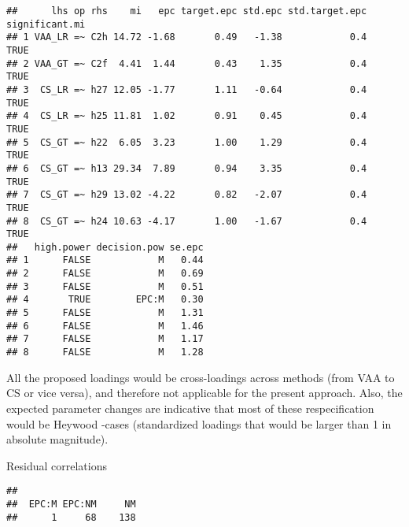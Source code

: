 \documentclass[
]{article}
\newenvironment{Shaded}{\begin{snugshade}}{\end{snugshade}}
\newcommand{\CommentTok}[1]{\textcolor[rgb]{0.56,0.35,0.01}{\textit{#1}}}
\newcommand{\DataTypeTok}[1]{\textcolor[rgb]{0.13,0.29,0.53}{#1}}
\newcommand{\DecValTok}[1]{\textcolor[rgb]{0.00,0.00,0.81}{#1}}
\newcommand{\KeywordTok}[1]{\textcolor[rgb]{0.13,0.29,0.53}{\textbf{#1}}}
\newcommand{\NormalTok}[1]{#1}
\newcommand{\OperatorTok}[1]{\textcolor[rgb]{0.81,0.36,0.00}{\textbf{#1}}}
\newcommand{\StringTok}[1]{\textcolor[rgb]{0.31,0.60,0.02}{#1}}
\begin{document}
\begin{verbatim}
##      lhs op rhs    mi   epc target.epc std.epc std.target.epc significant.mi
## 1 VAA_LR =~ C2h 14.72 -1.68       0.49   -1.38            0.4           TRUE
## 2 VAA_GT =~ C2f  4.41  1.44       0.43    1.35            0.4           TRUE
## 3  CS_LR =~ h27 12.05 -1.77       1.11   -0.64            0.4           TRUE
## 4  CS_LR =~ h25 11.81  1.02       0.91    0.45            0.4           TRUE
## 5  CS_GT =~ h22  6.05  3.23       1.00    1.29            0.4           TRUE
## 6  CS_GT =~ h13 29.34  7.89       0.94    3.35            0.4           TRUE
## 7  CS_GT =~ h29 13.02 -4.22       0.82   -2.07            0.4           TRUE
## 8  CS_GT =~ h24 10.63 -4.17       1.00   -1.67            0.4           TRUE
##   high.power decision.pow se.epc
## 1      FALSE            M   0.44
## 2      FALSE            M   0.69
## 3      FALSE            M   0.51
## 4       TRUE        EPC:M   0.30
## 5      FALSE            M   1.31
## 6      FALSE            M   1.46
## 7      FALSE            M   1.17
## 8      FALSE            M   1.28
\end{verbatim}

All the proposed loadings would be cross-loadings across methods (from
VAA to CS or vice versa), and therefore not applicable for the present
approach. Also, the expected parameter changes are indicative that most
of these respecification would be Heywood -cases (standardized loadings
that would be larger than 1 in absolute magnitude).

Residual correlations

\begin{Shaded}
\end{Shaded}

\begin{verbatim}
## 
##  EPC:M EPC:NM     NM 
##      1     68    138
\end{verbatim}
\end{document}
